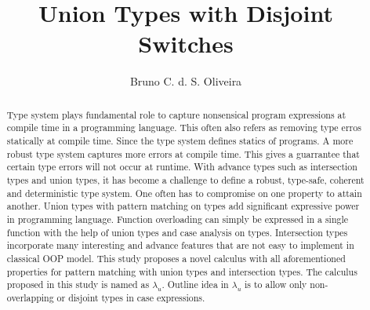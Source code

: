 \documentclass[acmsmall,review,anonymous]{acmart}\settopmatter{printfolios=true,printccs=false,printacmref=false}
\title{Union Types with Disjoint Switches}
\author{Bruno C. d. S. Oliveira}
\affiliation{
  \institution{The University of Hong Kong}            %
}
\newcommand{\cal}{$\lambda_{u}$\xspace}
\begin{document}
\begin{abstract}
Type system plays fundamental role to capture nonsensical program
expressions at compile time in a programming language. This often also
refers as removing type erros statically at compile time.  Since the
type system defines statics of programs. A more robust type system
captures more errors at compile time. This gives a guarrantee that
certain type errors will not occur at runtime.  With advance types
such as intersection types and union types, it has become a challenge
to define a robust, type-safe, coherent and deterministic type
system. One often has to compromise on one property to attain
another. Union types with pattern matching on types add significant
expressive power in programming language. Function overloading can
simply be expressed in a single function with the help of union types
and case analysis on types. Intersection types incorporate many
interesting and advance features that are not easy to implement in
classical OOP model.  This study proposes a novel calculus with all
aforementioned properties for pattern matching with union types and
intersection types. The calculus proposed in this study is named as
\cal.  Outline idea in \cal is to allow only non-overlapping or
disjoint types in case expressions.
\end{abstract}

\maketitle
















\end{document}
